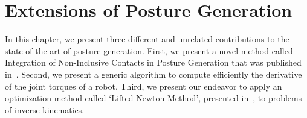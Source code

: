 

\chapter{Extensions of Posture Generation}
\label{cha:extensions_of_posture_generation}

\graphicspath{{Chapter3-Extensions/Figs/}{Chapter3-Extensions/Figs/IROS14/}}

In this chapter, we present three different and unrelated contributions to the state of the art of posture generation.
First, we present a novel method called Integration of Non-Inclusive Contacts in Posture Generation that was published in~\cite{brossette:iros:2014}.
Second, we present a generic algorithm to compute efficiently the derivative of the joint torques of a robot.
Third, we present our endeavor to apply an optimization method called `Lifted Newton Method', presented in~\cite{Albersmeyer:2010:LNM:1958447.1958472}, to problems of inverse kinematics.




